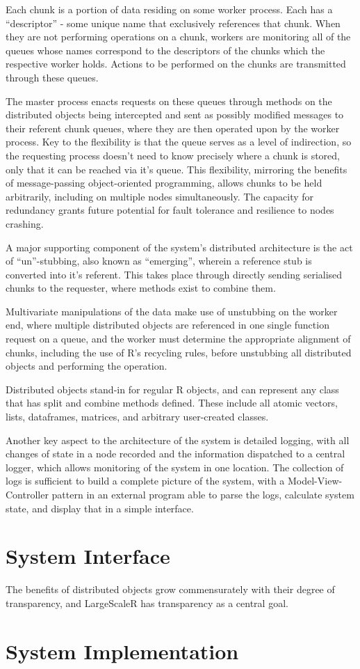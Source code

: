 \documentclass[a4paper,10pt]{article}
\begin{document}
Each chunk is a portion of data residing on some worker process.
Each has a ``descriptor'' - some unique name that exclusively references that chunk.
When they are not performing operations on a chunk, workers are monitoring all of the queues whose names correspond to the descriptors of the chunks which the respective worker holds.
Actions to be performed on the chunks are transmitted through these queues.

The master process enacts requests on these queues through methods on the distributed objects being intercepted and sent as possibly modified messages to their referent chunk queues, where they are then operated upon by the worker process.
Key to the flexibility is that the queue serves as a level of indirection, so the requesting process doesn't need to know precisely where a chunk is stored, only that it can be reached via it's queue.
This flexibility, mirroring the benefits of message-passing object-oriented programming, allows chunks to be held arbitrarily, including on multiple nodes simultaneously.
The capacity for redundancy grants future potential for fault tolerance and resilience to nodes crashing.

A major supporting component of the system's distributed architecture is the act of ``un''-stubbing, also known as ``emerging'', wherein a reference stub is converted into it's referent.
This takes place through directly sending serialised chunks to the requester, where methods exist to combine them.

Multivariate manipulations of the data make use of unstubbing on the worker end, where multiple distributed objects are referenced in one single function request on a queue, and the worker must determine the appropriate alignment of chunks, including the use of R's recycling rules, before unstubbing all distributed objects and performing the operation.

Distributed objects stand-in for regular R objects, and can represent any class that has split and combine methods defined.
These include all atomic vectors, lists, dataframes, matrices, and arbitrary user-created classes.

Another key aspect to the architecture of the system is detailed logging, with all changes of state in a node recorded and the information dispatched to a central logger, which allows monitoring of the system in one location. The collection of logs is sufficient to build a complete picture of the system, with a Model-View-Controller pattern in an external program able to parse the logs, calculate system state, and display that in a simple interface.

\section{System Interface}
The benefits of distributed objects grow commensurately with their degree of transparency, and LargeScaleR has transparency as a central goal.
\section{System Implementation}\label{sec:sys-imp}
\printbibliography
\end{document}
